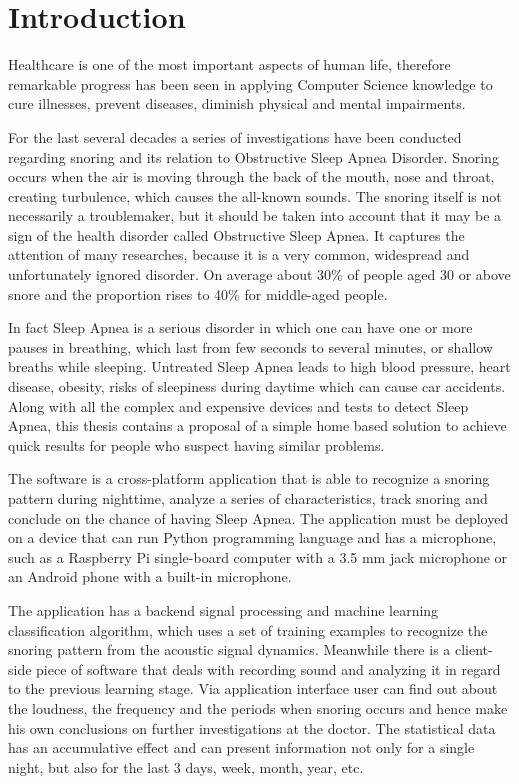 \section*{Introduction}
Healthcare is one of the most important aspects of human life, therefore remarkable progress has been seen in applying Computer Science knowledge to cure illnesses, prevent diseases, diminish physical and mental impairments. 

For the last several decades a series of investigations have been conducted regarding snoring and its relation to Obstructive Sleep Apnea Disorder. Snoring occurs when the air is moving through the back of the mouth, nose and throat, creating turbulence, which causes the all-known sounds. The snoring itself is not necessarily a troublemaker, but it should be taken into account that it may be a sign of the health disorder called Obstructive Sleep Apnea. It captures the attention of many researches, because it is a very common, widespread and unfortunately ignored disorder. On average about 30\% of people aged 30 or above snore and the proportion rises to 40\% for middle-aged people.

In fact Sleep Apnea is a serious disorder in which one can have one or more pauses in breathing, which last from few seconds to several minutes, or shallow breaths while sleeping. Untreated Sleep Apnea leads to high blood pressure, heart disease, obesity, risks of sleepiness during daytime which can cause car accidents. Along with all the complex and expensive devices and tests to detect Sleep Apnea, this thesis contains a proposal of a simple home based solution to achieve quick results for people who suspect having similar problems.

The software is a cross-platform application that is able to recognize a snoring pattern during nighttime, analyze a series of characteristics, track snoring and conclude on the chance of having Sleep Apnea. The application must be deployed on a device that can run Python programming language and has a microphone, such as a Raspberry Pi single-board computer with a 3.5 mm jack microphone or an Android phone with a built-in microphone.

The application has a backend signal processing and machine learning classification algorithm, which uses a set of training examples to recognize the snoring pattern from the acoustic signal dynamics. Meanwhile there is a client-side piece of software that deals with recording sound and analyzing it in regard to the previous learning stage. Via application interface user can find out about the loudness, the frequency and the periods when snoring occurs and hence make his own conclusions on further investigations at the doctor. The statistical data has an accumulative effect and can present information not only for a single night, but also for the last 3 days, week, month, year, etc.

